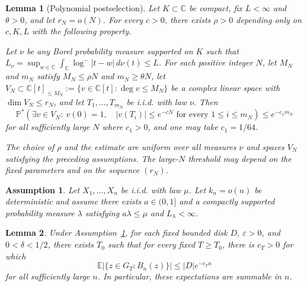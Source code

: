 \documentclass[10pt,a4paper]{amsart}
\newtheorem{lemma}{Lemma}
\newtheorem{assumption}{Assumption}
\newcommand{\C}{\mathbb C}
\newcommand{\E}{\mathbb E}
\newcommand{\Prob}{\mathbb P}
\newcommand{\logm}{\log^-}
\begin{document}
\begin{lemma}[Polynomial postselection]\label{lem:postselection}
Let $K\subset\C$ be compact, fix $L<\infty$ and $\theta>0$, and let
$r_N=o(N)$. For every $c>0$, there exists $\rho>0$ depending only on $c, K, L$ with the following property.

Let $\nu$ be any Borel probability measure supported on $K$ such that $L_\nu=\sup_{w\in\C} \int_\C\logm|t-w|\,d\nu(t)\le L$.
For each positive integer $N$, let $M_N$ and $m_N$ satisfy $M_N\le\rho N$ and $m_N\ge\theta N$, let $V_N\subset\C[t]_{\le M_N}:=\{v\in \C[t]:\deg v\le M_N\}$ be a complex linear space with $\dim V_N\le r_N$, and let
$T_1,\ldots,T_{m_N}$ be i.i.d. with law $\nu$. Then
\[\Prob^*\!\left( \exists v\in V_N:\ v(0)=1,\quad |v(T_i)|\le e^{-cN}
     \text{ for every }1\le i\le m_N\right)
 \le e^{-c_1m_N}\]
for all sufficiently large $N$ where $c_1>0$, and one may take $c_1=1/64$.

The choice of $\rho$ and the estimate are uniform over all measures $\nu$
and spaces $V_N$ satisfying the preceding assumptions. The large-$N$
threshold may depend on the fixed parameters and on the sequence $(r_N)$.
\end{lemma}

\begin{assumption}\label{assump}
    Let $X_1,\ldots, X_n$ be i.i.d. with law $\mu$. Let $k_n=o(n)$ be deterministic and assume there exists $a\in (0,1]$ and a compactly supported probability measure $\lambda$ satisfying $a\lambda\le \mu$ and $L_\lambda<\infty$.
\end{assumption} %

\begin{lemma}\label{lem:summable}
    Under Assumption~\ref{assump}, for each fixed bounded disk $D$, $\varepsilon>0$, and $0<\delta<1/2$, there exists $T_0$ such that for every fixed $T\ge T_0$, there is $c_T>0$ for which 
    \[\E|\{z\in G_T:B_n(z)\}|\le |D|e^{-c_T n}\]
    for all sufficiently large $n$. In particular, these expectations are summable in $n$.
\end{lemma}
\end{document}
